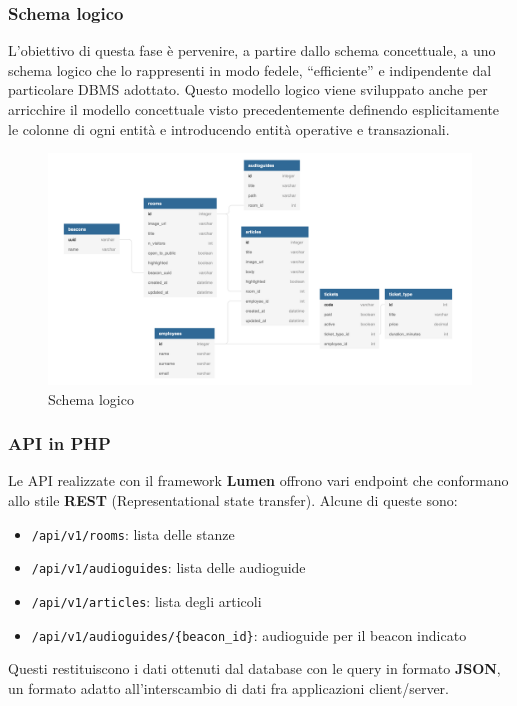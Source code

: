 \documentclass[12pt]{article}
\begin{document}
\clearpage

\subsubsection{Schema logico}
L’obiettivo di questa fase è pervenire, a partire dallo schema concettuale, a uno schema logico che
lo rappresenti in modo fedele, “efficiente” e indipendente dal particolare DBMS adottato. Questo modello logico viene sviluppato anche per arricchire il modello concettuale visto precedentemente definendo esplicitamente le colonne di ogni entità e introducendo entità operative e transazionali.

\begin{center}
    \begin{figure}[htp]
        \centering
        \includegraphics[width=\textwidth]{diagrams/logic_scheme.png}
        \caption{Schema logico}
        \label{fig:logic_scheme}
    \end{figure}
\end{center}

\subsubsection{API in PHP}
Le API realizzate con il framework \textbf{Lumen} offrono vari endpoint che conformano allo stile \textbf{REST} (Representational state transfer). Alcune di queste sono:
\begin{itemize}
    \item \verb+/api/v1/rooms+: lista delle stanze
    \item \verb+/api/v1/audioguides+: lista delle audioguide
    \item \verb+/api/v1/articles+: lista degli articoli
    \item \verb+/api/v1/audioguides/{beacon_id}+: audioguide per il beacon indicato
\end{itemize}
Questi restituiscono i dati ottenuti dal database con le query in formato \textbf{JSON}, un formato adatto all'interscambio di dati fra applicazioni client/server.
\end{document}
